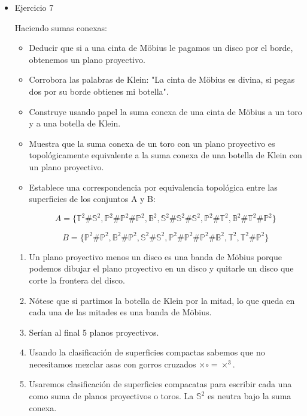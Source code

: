 \documentclass[11pt]{article}
\begin{document}
\begin{itemize}
\item Ejercicio 7
\label{sec-5-3-1-7}
\begin{statement}
Haciendo sumas conexas:

\begin{itemize}
\item Deducir que si a una cinta de Möbius le pagamos un disco por el borde,
obtenemos un plano proyectivo.
\item Corrobora las palabras de Klein: "La cinta de Möbius es divina, si pegas
dos por su borde obtienes mi botella".
\item Construye usando papel la suma conexa de una cinta de Möbius a un toro
y a una botella de Klein.
\item Muestra que la suma conexa de un toro con un plano proyectivo es 
topológicamente equivalente a la suma conexa de una botella de Klein con
un plano proyectivo.
\item Establece una correspondencia por equivalencia topológica entre las
superficies de los conjuntos A y B:

\[
   A = \{
   \mathbb{T}^2\#\mathbb{S}^2,
   \mathbb{P}^2\#\mathbb{P}^2\#\mathbb{P}^2,
   \mathbb{B}^2,
   \mathbb{S}^2\#\mathbb{S}^2\#\mathbb{S}^2,
   \mathbb{P}^2\#\mathbb{T}^2,
   \mathbb{B}^2\#\mathbb{T}^2\#\mathbb{P}^2
   \}
   \]

\[
   B = \{
   \mathbb{P}^2\#\mathbb{P}^2,
   \mathbb{B}^2\#\mathbb{P}^2,
   \mathbb{S}^2\#\mathbb{S}^2,
   \mathbb{P}^2\#\mathbb{P}^2\#\mathbb{P}^2\#\mathbb{B}^2,
   \mathbb{T}^2,
   \mathbb{T}^2\#\mathbb{P}^2
   \}
   \]
\end{itemize}
\end{statement}

\begin{enumerate}
\item Un plano proyectivo menos un disco es una banda de Möbius porque
podemos dibujar el plano proyectivo en un disco y quitarle un disco
que corte la frontera del disco.
\item Nótese que si partimos la botella de Klein por la mitad, lo que queda
en cada una de las mitades es una banda de Möbius.
\item Serían al final 5 planos proyectivos.
\item Usando la clasificación de superficies compactas sabemos que no
necesitamos mezclar asas con gorros cruzados $\times \circ = \times^3$.
\item Usaremos clasificación de superficies compacatas para escribir cada
una como suma de planos proyectivos o toros. La $\mathbb{S}^2$ es neutra bajo la
suma conexa.


\end{enumerate}
\end{itemize}
\end{document}

